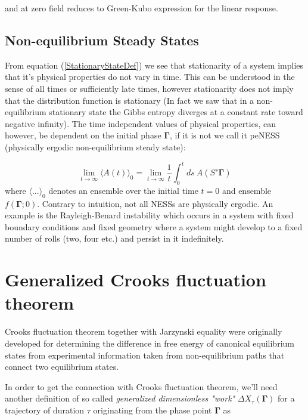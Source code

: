\documentclass[a4paper,12pt,nofootinbib]{article}
\begin{document}
and at zero field reduces to Green-Kubo expression for the linear response.


\subsection{Non-equilibrium Steady States}

From equation (\ref{StationaryStateDef}) we see that stationarity of a system implies that it's physical properties do not vary in time. This can be understood in the sense of all times or sufficiently late times, however stationarity does not imply that the distribution function is stationary (In fact we saw that in a non-equilibrium stationary state the Gibbs entropy diverges at a constant rate toward negative infinity).
The time independent values of physical properties, can however, be dependent on the initial phase $\bm{\Gamma}$, if it is not we call it peNESS (physically ergodic non-equilibrium steady state):

\begin{equation}
      \lim_{t \to \infty} \langle A(t) \rangle_0 = \lim_{t \to \infty} \frac{1}{t} \int_0^t ds\ A(S^s \bm{\Gamma})
\end{equation}
 where $\langle ... \rangle_0$ denotes an ensemble over the initial time $t=0$ and ensemble $f(\bm{\Gamma};0)$.
Contrary to intuition, not all NESSs are physically ergodic. An example is the Rayleigh-Benard instability which occurs in a system with fixed boundary conditions and fixed geometry where a system might develop to a fixed number of rolls (two, four etc.) and persist in it indefinitely.
\section{Generalized Crooks fluctuation theorem}

Crooks fluctuation theorem together with Jarzynski equality were originally developed for determining the difference in free energy of canonical equilibrium states from experimental information taken from non-equilibrium paths that connect two equilibrium states. 

In order to get the connection with Crooks fluctuation theorem, we'll need another definition of so called \textit{generalized dimensionless "work"} $\Delta X_{\tau}(\bm{\Gamma})$ for a trajectory of duration $\tau$ originating from the phase point $\bm{\Gamma}$ as
\end{document}
